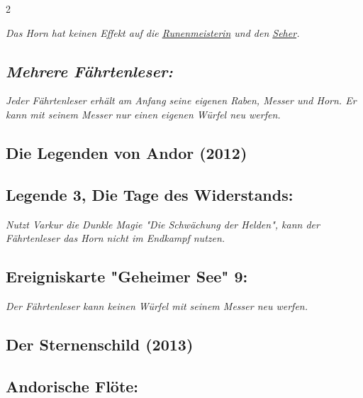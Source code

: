 \documentclass[10pt, a4paper, oneside]{book}
\newcommand{\fan}[1]{\textit{#1}}
\begin{document}
\begin{multicols*}{2}
\begin{nobgcolor}
\fan{Das Horn hat keinen Effekt auf die \hyperref[Runenmeisterin]{Runenmeisterin} und den \hyperref[Seher]{Seher}.}







\subsection{\fan{Mehrere Fährtenleser:}}

\fan{Jeder Fährtenleser erhält am Anfang seine eigenen Raben, Messer und Horn. Er kann mit seinem Messer nur einen eigenen Würfel neu werfen.}



\end{nobgcolor}


\begin{bgcolor}
\section{Die Legenden von Andor (2012)}

\subsection{Legende 3, Die Tage des Widerstands:}

\fan{Nutzt Varkur die Dunkle Magie "Die Schwächung der Helden", kann der Fährtenleser das Horn nicht im Endkampf nutzen.}



\subsection{Ereigniskarte "Geheimer See" 9:}

\fan{Der Fährtenleser kann keinen Würfel mit seinem Messer neu werfen.}





\end{bgcolor}


\begin{bgcolor}
\section{Der Sternenschild (2013)}

\subsection{Andorische Flöte:}


\end{bgcolor}
\end{multicols*}
\end{document}
